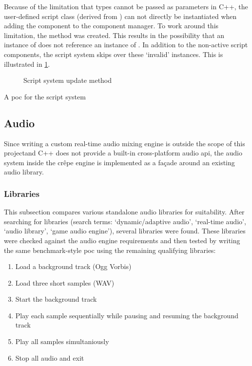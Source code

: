 \documentclass{projdoc}
\begin{document}
Because of the limitation that types cannot be passed as parameters in C++, the
user-defined script class (derived from ) can not directly be
instantiated when adding the component to the component manager. To work around this
limitation, the method  was created. This
results in the possibility that an instance of  does not
reference an instance of . In addition to the non-active script
components, the script system skips over these `invalid' instances. This is
illustrated in \cref{fig:activity-scripts}.

\begin{figure}
	\centering
	\caption{Script system update method}
	\label{fig:activity-scripts}
\end{figure}

A \gls{poc} for the script system

\subsection{Audio}

Since writing a custom real-time audio mixing engine is outside the scope of this
project\mref and C++ does not provide a built-in cross-platform audio \gls{api}, the
audio system inside the cr\^epe engine is implemented as a fa\c{c}ade around an
existing audio library.

\subsubsection{Libraries}
\label{sec:audio:libs}

This subsection compares various standalone audio libraries for suitability. After
searching for libraries (search terms: `dynamic/adaptive audio', `real-time audio',
`audio library', `game audio engine'), several libraries were found. These libraries
were checked against the audio engine requirements \autocite{crepe:requirements} and
then tested by writing the same benchmark-style \gls{poc} using the remaining
qualifying libraries:\noparbreak
\begin{enumerate}
	\item Load a background track (Ogg Vorbis)
	\item Load three short samples (WAV)
	\item Start the background track
	\item Play each sample sequentially while pausing and resuming the background track
	\item Play all samples simultaniously
	\item Stop all audio and exit
\end{enumerate}
\end{document}
